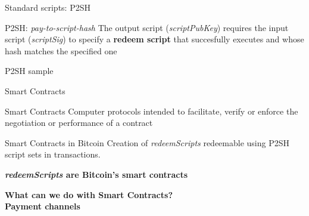 \documentclass{beamer}
\begin{document}
\begin{frame}{Standard scripts: P2SH}
 \begin{block}{P2SH: \textit{pay-to-script-hash}}
  The output script (\textit{scriptPubKey}) requires the input script (\textit{scriptSig}) to specify a \textbf{redeem script} that succesfully executes and whose hash matches the specified one
 \end{block}
 \pause
 \begin{exampleblock}{P2SH sample}
  \begin{itemize}
  \end{itemize}
 \end{exampleblock}
\end{frame}
\begin{frame}{Smart Contracts}
 \begin{block}{Smart Contracts}
  Computer protocols intended to facilitate, verify or enforce the negotiation or performance of a contract
 \end{block}
 \pause
 \begin{block}{Smart Contracts in Bitcoin}
  Creation of \textit{redeemScripts} redeemable using P2SH script sets in transactions.
  \pause
  \begin{center}
   \textbf{\textit{redeemScripts} are Bitcoin's smart contracts}
  \end{center}
 \end{block}
\end{frame}
\begin{frame}
 \begin{center}
  \textbf{What can we do with Smart Contracts?}\\
  \pause
  \huge\textbf{Payment channels}
 \end{center}
\end{frame}
\end{document}
